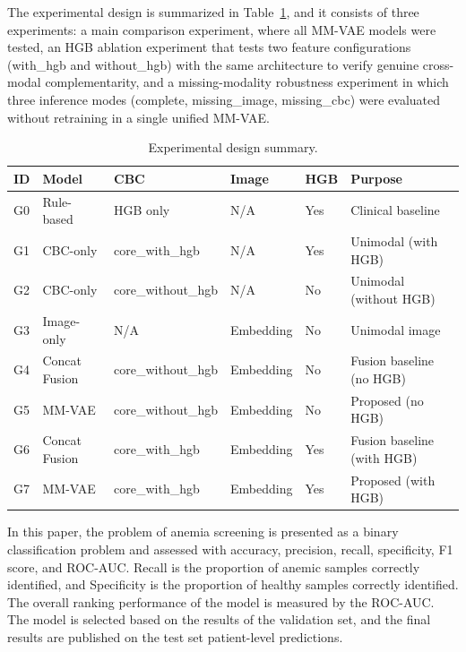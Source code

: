 \documentclass[conference]{IEEEtran}
\begin{document}
The experimental design is summarized in Table~\ref{tab:experiment-design}, and it consists of three experiments: a main comparison experiment, where all MM-VAE models were tested, an HGB ablation experiment that tests two feature configurations (with\_hgb and without\_hgb) with the same architecture to verify genuine cross-modal complementarity, and a missing-modality robustness experiment in which three inference modes (complete, missing\_image, missing\_cbc) were evaluated without retraining in a single unified MM-VAE.

\begin{table}[t]
\caption{Experimental design summary.}
\label{tab:experiment-design}
\centering
\small
\begin{tabular}{p{}p{}p{}p{}p{}p{}}
\hline
\textbf{ID} & \textbf{Model} & \textbf{CBC} & \textbf{Image} & \textbf{HGB} & \textbf{Purpose} \\
\hline
G0 & Rule-based & HGB only & N/A & Yes & Clinical baseline \\
G1 & CBC-only & core\_with\_hgb & N/A & Yes & Unimodal (with HGB) \\
G2 & CBC-only & core\_without\_hgb & N/A & No & Unimodal (without HGB) \\
G3 & Image-only & N/A & Embedding & No & Unimodal image \\
G4 & Concat Fusion & core\_without\_hgb & Embedding & No & Fusion baseline (no HGB) \\
G5 & MM-VAE & core\_without\_hgb & Embedding & No & Proposed (no HGB) \\
G6 & Concat Fusion & core\_with\_hgb & Embedding & Yes & Fusion baseline (with HGB) \\
G7 & MM-VAE & core\_with\_hgb & Embedding & Yes & Proposed (with HGB) \\
\hline
\end{tabular}
\end{table}

In this paper, the problem of anemia screening is presented as a binary classification problem and assessed with accuracy, precision, recall, specificity, F1 score, and ROC-AUC. Recall is the proportion of anemic samples correctly identified, and Specificity is the proportion of healthy samples correctly identified. The overall ranking performance of the model is measured by the ROC-AUC. The model is selected based on the results of the validation set, and the final results are published on the test set patient-level predictions.
\end{document}
